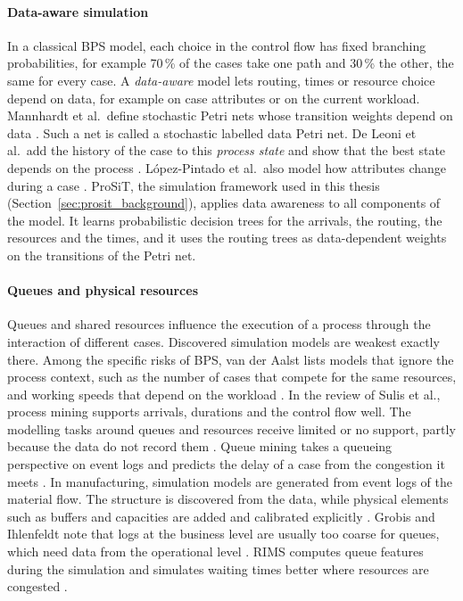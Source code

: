 \paragraph{Data-aware simulation}
In a classical BPS model, each choice in the control flow has fixed branching
probabilities, for example 70\,\% of the cases take one path and 30\,\% the
other, the same for every case. A \emph{data-aware} model lets routing, times or
resource choice depend on data, for example on case attributes or on the
current workload. Mannhardt et al.\ define stochastic Petri nets whose transition
weights depend on data \cite{mannhardt2023stochasticProcessesModelling}. Such a
net is called a stochastic labelled data Petri net. De Leoni et al.\ add the
history of the case to this \emph{process state} and show that the best state
depends on the process \cite{Vinci2023Inf.Activ.Prob}. L\'opez-Pintado et al.\
also model how attributes change during a case \cite{lopez2024}. ProSiT, the
simulation framework used in this thesis (Section~\ref{sec:prosit_background}),
applies data awareness to all components of the model. It learns probabilistic
decision trees for the arrivals, the routing, the resources and the times, and
it uses the routing trees as data-dependent weights on the transitions of the
Petri net.

\paragraph{Queues and physical resources}
Queues and shared resources influence the execution of a process through the
interaction of different cases. Discovered simulation models are weakest
exactly there. Among the specific risks of BPS, van der Aalst lists models that
ignore the process context, such as the number of cases that compete for the
same resources, and working speeds that depend on the workload \cite{Aalst2015}.
In the review of Sulis et al., process mining supports arrivals, durations and
the control flow well. The modelling tasks around queues and resources receive
limited or no support, partly because the data do not record them
\cite{Sulis2026SimulationReview}. Queue mining takes a queueing perspective on
event logs and predicts the delay of a case from the congestion it meets
\cite{Senderovich2015QueueMining}. In manufacturing, simulation models are
generated from event logs of the material flow. The structure is discovered from
the data, while physical elements such as buffers and capacities are added and
calibrated explicitly \cite{LugaresiMatta2021}. Grobis and
Ihlenfeldt note that logs at the business level are usually too coarse for
queues, which need data from the operational level
\cite{Grobis2025ProductionLogistics}. RIMS computes queue features during the
simulation and simulates waiting times better where resources are congested
\cite{runtimeIntegration2024}.

